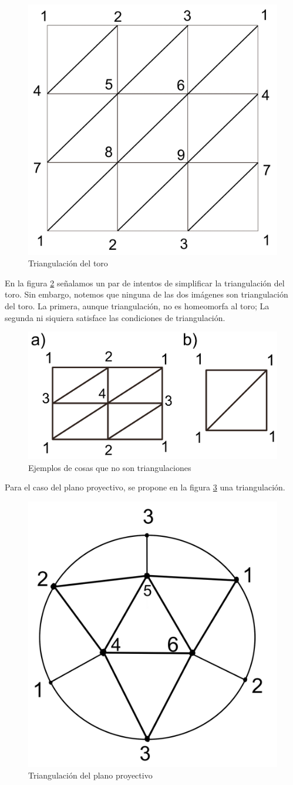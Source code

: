 \documentclass[a4paper,11pt,spanish, twoside, leqno]{tfg-uam}
\theoremstyle{definition}
\begin{document}
\begin{figure}[h!]
	\centering
	\includegraphics[width=0.3\linewidth]{imagenes/toro_triangulado.png}
	\caption{Triangulación del toro}
	\label{fig:toro triangulado}
\end{figure} 
En la figura \ref{fig:no triangulaciones} señalamos un par de intentos de simplificar la triangulación del toro. Sin embargo, notemos que ninguna de las dos imágenes son triangulación del toro. La primera, aunque triangulación, no es homeomorfa al toro; La segunda ni siquiera satisface las condiciones de triangulación.


\begin{figure}[h!]
	\centering
	\includegraphics[width=0.5\linewidth]{imagenes/no_triangulaciones.png}
	\caption{Ejemplos de cosas que no son triangulaciones}
	
	\label{fig:no triangulaciones}
\end{figure} 


Para el caso del plano proyectivo, se propone en la figura \ref{fig:plano proyectivo triangulado} una triangulación.
\begin{figure}[h!]
	\centering
	\includegraphics[width=0.3\linewidth]{imagenes/planop_triangulado.png}
	\caption{Triangulación del plano proyectivo}
	\label{fig:plano proyectivo triangulado}
\end{figure} 
\end{document}
